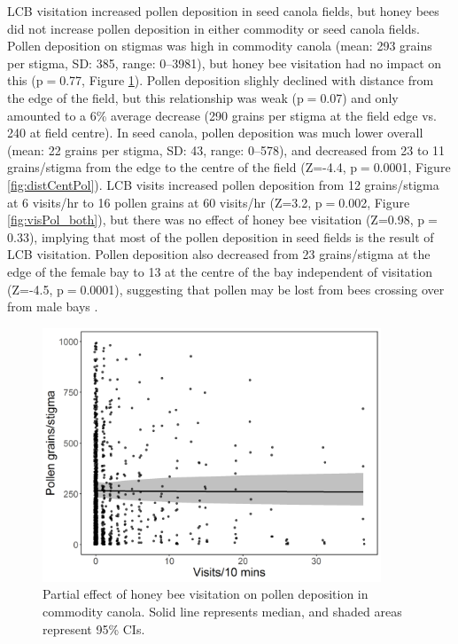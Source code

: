 \documentclass[12pt]{article} %
\begin{document}
LCB visitation increased pollen deposition in seed canola fields, but honey bees did not increase pollen deposition in either commodity or seed canola fields.
Pollen deposition on stigmas was high in commodity canola (mean: 293 grains per stigma, SD: 385, range: 0--3981), but honey bee visitation had no impact on this (p$=$0.77, Figure \ref{fig:hbeeVisPol}).
Pollen deposition slighly declined with distance from the edge of the field, but this relationship was weak (p$=$0.07) and only amounted to a 6\% average decrease (290 grains per stigma at the field edge vs. 240 at field centre).
In seed canola, pollen deposition was much lower overall (mean: 22 grains per stigma, SD: 43, range: 0--578), and decreased from 23 to 11 grains/stigma from the edge to the centre of the field (Z=-4.4, p$=$0.0001, Figure \ref{fig:distCentPol}).
LCB visits increased pollen deposition from 12 grains/stigma at 6 visits/hr to 16 pollen grains at 60 visits/hr (Z=3.2, p$=$0.002, Figure \ref{fig:visPol_both}), but there was no effect of honey bee visitation (Z=0.98, p$=$0.33), implying that most of the pollen deposition in seed fields is the result of LCB visitation.
Pollen deposition also decreased from 23 grains/stigma at the edge of the female bay to 13 at the centre of the bay independent of visitation (Z=-4.5, p$=$0.0001), suggesting that pollen may be lost from bees crossing over from male bays \citep{pinnisch1990}.%

\begin{figure}
    \centering
    \includegraphics[width=0.9\textwidth,keepaspectratio=true]{slopeHbeeVisPol.png}
    \caption[Partial effect of honey bee visitation on pollen deposition in commodity canola]{Partial effect of honey bee visitation on pollen deposition in commodity canola. Solid line represents median, and shaded areas represent 95\% CIs.}
    \label{fig:hbeeVisPol}
\end{figure}
\end{document}
